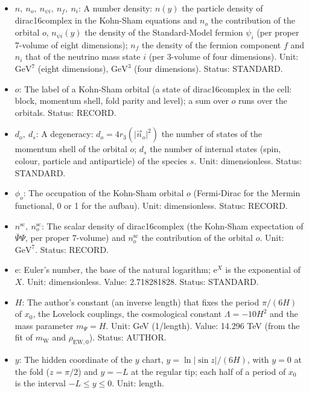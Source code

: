 \documentclass[
  10pt,
]{article}
\providecommand{\tightlist}{%
  \setlength{\itemsep}{0pt}\setlength{\parskip}{0pt}}
\begin{document}
\begin{itemize}
\tightlist
\item
  \(n,\ n_o,\ n_{\psi i},\ n_f,\ n_i\): A number density: \(n(y)\) the
  particle density of dirac16complex in the Kohn-Sham equations and
  \(n_o\) the contribution of the orbital \(o\), \(n_{\psi i}(y)\) the
  density of the Standard-Model fermion \(\psi_i\) (per proper 7-volume
  of eight dimensions); \(n_f\) the density of the fermion component
  \(f\) and \(n_i\) that of the neutrino mass state \(i\) (per 3-volume
  of four dimensions). Unit: \(\mathrm{GeV}^{7}\) (eight dimensions),
  \(\mathrm{GeV}^{3}\) (four dimensions). Status: STANDARD.
\item
  \(o\): The label of a Kohn-Sham orbital (a state of dirac16complex in
  the cell: block, momentum shell, fold parity and level); a sum over
  \(o\) runs over the orbitals. Status: RECORD.
\item
  \(d_o,\ d_s\): A degeneracy: \(d_o = 4r_3(\lvert\vec n_o\rvert^2)\)
  the number of states of the momentum shell of the orbital \(o\);
  \(d_s\) the number of internal states (spin, colour, particle and
  antiparticle) of the species \(s\). Unit: dimensionless. Status:
  STANDARD.
\item
  \(\phi_o\): The occupation of the Kohn-Sham orbital \(o\) (Fermi-Dirac
  for the Mermin functional, 0 or 1 for the aufbau). Unit:
  dimensionless. Status: RECORD.
\item
  \(n^{\mathrm{sc}},\ n^{\mathrm{sc}}_o\): The scalar density of
  dirac16complex (the Kohn-Sham expectation of \(\bar\Psi\Psi\), per
  proper 7-volume) and \(n^{\mathrm{sc}}_o\) the contribution of the
  orbital \(o\). Unit: \(\mathrm{GeV}^{7}\). Status: RECORD.
\item
  \(\mathrm{e}\): Euler's number, the base of the natural logarithm;
  \(\mathrm{e}^{X}\) is the exponential of \(X\). Unit: dimensionless.
  Value: 2.718281828. Status: STANDARD.
\item
  \(H\): The author's constant (an inverse length) that fixes the period
  \(\pi/(6H)\) of \(x_0\), the Lovelock couplings, the cosmological
  constant \(\Lambda = -10H^2\) and the mass parameter \(m_\Psi = H\).
  Unit: GeV (1/length). Value: 14.296 TeV (from the fit of
  \(m_{\mathrm{W}}\) and \(\rho_{\mathrm{EW},0}\)). Status: AUTHOR.
\item
  \(y\): The hidden coordinate of the \(y\) chart,
  \(y = \ln\lvert\sin z\rvert/(6H)\), with \(y = 0\) at the fold
  (\(z = \pi/2\)) and \(y = -L\) at the regular tip; each half of a
  period of \(x_0\) is the interval \(-L \le y \le 0\). Unit: length.

\end{itemize}
\end{document}
